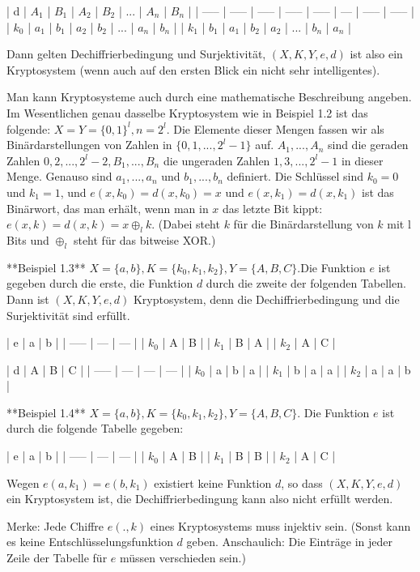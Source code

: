 \documentclass[a4paper]{article}
\begin{document}
\begin{multicols}{3}
    | d     | $A_1$ | $B_1$ | $A_2$ | $B_2$ | ... | $A_n$ | $B_n$ |
    | ----- | ----- | ----- | ----- | ----- | --- | ----- | ----- |
    | $k_0$ | $a_1$ | $b_1$ | $a_2$ | $b_2$ | ... | $a_n$ | $b_n$ |
    | $k_1$ | $b_1$ | $a_1$ | $b_2$ | $a_2$ | ... | $b_n$ | $a_n$ |

    Dann gelten Dechiffrierbedingung und Surjektivität, $(X,K,Y,e,d)$ ist also ein Kryptosystem (wenn auch auf den ersten Blick ein nicht sehr intelligentes).

    Man kann Kryptosysteme auch durch eine mathematische Beschreibung angeben. Im Wesentlichen genau dasselbe Kryptosystem wie in Beispiel 1.2 ist das folgende: $X=Y=\{0,1\}^l,n=2^l$. Die Elemente dieser Mengen fassen wir als Binärdarstellungen von Zahlen in $\{0, 1,..., 2^l-1\}$ auf. $A_1,...,A_n$ sind die geraden Zahlen $0,2,...,2^l-2,B_1,...,B_n$ die ungeraden Zahlen $1,3,...,2^l- 1$ in dieser Menge.
    Genauso sind $a_1,...,a_n$ und $b_1,...,b_n$ definiert. Die Schlüssel sind $k_0=0$ und $k_1=1$, und $e(x,k_0)=d(x,k_0)=x$ und $e(x,k_1)=d(x,k_1)$ ist das Binärwort, das man erhält, wenn man in $x$ das letzte Bit kippt: $e(x,k) =d(x,k) =x\oplus_l k$.
    (Dabei steht $k$ für die Binärdarstellung von $k$ mit l Bits und $\oplus_l$ steht für das bitweise XOR.)

    **Beispiel 1.3** $X=\{a,b\},K=\{k_0,k_1,k_2\},Y=\{A,B,C\}$.Die Funktion $e$ ist gegeben durch die erste, die Funktion $d$ durch die zweite der folgenden Tabellen. Dann ist $(X,K,Y,e,d)$ Kryptosystem, denn die Dechiffrierbedingung und die Surjektivität sind erfüllt.

    | e     | a   | b   |
    | ----- | --- | --- |
    | $k_0$ | A   | B   |
    | $k_1$ | B   | A   |
    | $k_2$ | A   | C   |

    | d     | A   | B   | C   |
    | ----- | --- | --- | --- |
    | $k_0$ | a   | b   | a   |
    | $k_1$ | b   | a   | a   |
    | $k_2$ | a   | a   | b   |

    **Beispiel 1.4** $X=\{a,b\},K=\{k_0,k_1,k_2\},Y=\{A,B,C\}$. Die Funktion $e$ ist durch die folgende Tabelle gegeben:

    | e     | a   | b   |
    | ----- | --- | --- |
    | $k_0$ | A   | B   |
    | $k_1$ | B   | B   |
    | $k_2$ | A   | C   |

    Wegen $e(a,k_1)=e(b,k_1)$ existiert keine Funktion $d$, so dass $(X,K,Y,e,d)$ ein Kryptosystem ist, die Dechiffrierbedingung kann also nicht erfüllt werden.

    Merke: Jede Chiffre $e(.,k)$ eines Kryptosystems muss injektiv sein. (Sonst kann es keine Entschlüsselungsfunktion $d$ geben. Anschaulich: Die Einträge in jeder Zeile der Tabelle für $e$ müssen verschieden sein.)


\end{multicols}
\end{document}
